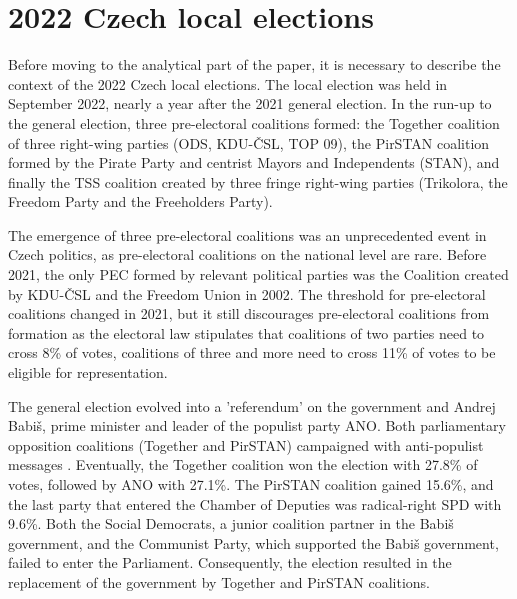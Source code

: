 \documentclass[]{interact}
\theoremstyle{plain}%
\theoremstyle{definition}
\theoremstyle{remark}
\begin{document}
\section{2022 Czech local elections}

Before moving to the analytical part of the paper, it is necessary to describe the context of the 2022 Czech local elections. The local election was held in September 2022, nearly a year after the 2021 general election. 
In the run-up to the general election, three pre-electoral coalitions formed: the Together coalition of three right-wing parties (ODS, KDU-ČSL, TOP 09), the PirSTAN coalition formed by the Pirate Party and centrist Mayors and Independents (STAN), and finally the TSS coalition created by three fringe right-wing parties (Trikolora, the Freedom Party and the Freeholders Party). 

The emergence of three pre-electoral coalitions was an unprecedented event in Czech politics, as pre-electoral coalitions on the national level are rare. Before 2021, the only PEC formed by relevant political parties was the Coalition created by KDU-ČSL and the Freedom Union in 2002. The threshold for pre-electoral coalitions changed in 2021, but it still discourages pre-electoral coalitions from formation as the electoral law stipulates that coalitions of two parties need to cross 8\% of votes, coalitions of three and more need to cross 11\% of votes to be eligible for representation. 

The general election evolved into a 'referendum' on the government and Andrej Babiš, prime minister and leader of the populist party ANO. Both parliamentary opposition coalitions (Together and PirSTAN) campaigned with anti-populist messages \citep[c.f.][]{havlik2022}. Eventually, the Together coalition won the election with 27.8\% of votes, followed by ANO with 27.1\%. The PirSTAN coalition gained 15.6\%, and the last party that entered the Chamber of Deputies was radical-right SPD with 9.6\%. Both the Social Democrats, a junior coalition partner in the Babiš government, and the Communist Party, which supported the Babiš government, failed to enter the Parliament. Consequently, the election resulted in the replacement of the government by Together and PirSTAN coalitions.
\end{document}
